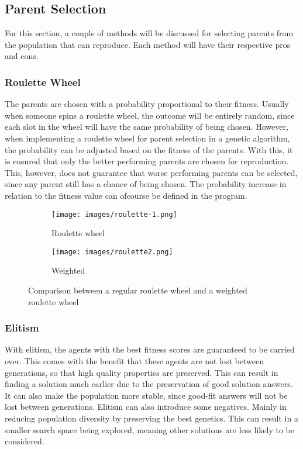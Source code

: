 \documentclass{article}
\begin{document}
\bigskip
\subsection{Parent Selection}
For this section, a couple of methods will be discussed for selecting parents from the population that can reproduce. Each method will have their respective pros and cons.

\subsubsection{Roulette Wheel}
The parents are chosen with a probability proportional to their fitness. Usually when someone spins a roulette wheel, the outcome will be entirely random, since each slot in the wheel will have the same probability of being chosen. However, when implementing a roulette wheel for parent selection in a genetic algorithm, the probability can be adjusted based on the fitness of the parents. With this, it is ensured that only the better performing parents are chosen for reproduction. This, however, does not guarantee that worse performing parents can be selected, since any parent still has a chance of being chosen. The probability increase in relation to the fitness value can ofcourse be defined in the program. 

\begin{figure}[h!]
    \centering
    \begin{subfigure}[b]{0.2\linewidth}
      \texttt{[image: images/roulette-1.png]}
      \caption{Roulette wheel}
    \end{subfigure}
    \begin{subfigure}[b]{0.2\linewidth}
      \texttt{[image: images/roulette2.png]}
      \caption{Weighted}
    \end{subfigure}
    \caption{Comparison between a regular roulette wheel and a weighted roulette wheel}
    \label{fig:roulette}
\end{figure}

\bigskip
\subsubsection{Elitism}
With elitism, the agents with the best fitness scores are guaranteed to be carried over. This comes with the benefit that these agents are not lost between generations, so that high quality properties are preserved. This can result in finding a solution much earlier due to the preservation of good solution answers. It can also make the population more stable, since good-fit answers will not be lost between generations.\smallskip
Elitism can also introduce some negatives. Mainly in reducing population diversity by preserving the best genetics. This can result in a smaller search space being explored, meaning other solutions are less likely to be considered.
\end{document}

